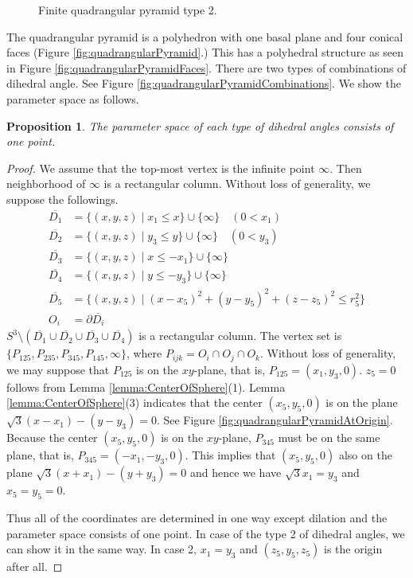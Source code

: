 \documentclass[suppldata, dvipdfmx]{interact}
\theoremstyle{plain}%
\newtheorem{proposition}[theorem]{Proposition}
\theoremstyle{definition}
\theoremstyle{remark}
\theoremstyle{problemstyle}
\begin{document}
\begin{figure}[h!tbp]
\begin{minipage}{0.5\textwidth}
\begin{minipage}[t]{0.24\textwidth}
   \label{fig:pentahedralPyramidLimitsetFinite2}
  \end{minipage}
  \hspace*{\fill}
  \caption{Finite quadrangular pyramid type 2.}
  \label{fig:pentahedralPyramidFinite2}
 \end{minipage}
\end{figure}

The quadrangular pyramid is a polyhedron with one basal plane and four conical faces (Figure \ref{fig:quadrangularPyramid}.)  
This has a polyhedral structure as seen in Figure \ref{fig:quadrangularPyramidFaces}. 
There are two types of combinations of dihedral angle. See Figure \ref{fig:quadrangularPyramidCombinations}.  
We show the parameter space as follows.

\begin{proposition}
The parameter space of each type of dihedral angles consists of one point.
\end{proposition}

\begin{proof}
We assume that the top-most vertex is the infinite point $\infty$.  Then neighborhood of $\infty$ is a rectangular column.  Without loss of generality, 
we suppose the followings.
\begin{align*}
\overline{D_1}&=\{(x,y,z) \mid x_1 \le x \} \cup\{\infty\} \quad (0<x_1)\\
\overline{D_2}&=\{(x,y,z) \mid y_3 \le y \} \cup\{\infty\}\quad (0<y_3)\\
\overline{D_3}&=\{(x,y,z) \mid x \le -x_1 \} \cup\{\infty\}\\
\overline{D_4}&=\{(x,y,z) \mid y \le -y_3 \} \cup\{\infty\}\\
\overline{D_5}&=\{(x,y,z) \mid (x-x_5)^2+(y-y_5)^2+(z-z_5)^2 \le r_5^2\} \\
O_i &= \partial\overline{D_i}
\end{align*}
$S^3\setminus(\overline{D_1}\cup\overline{D_2}\cup\overline{D_3}\cup\overline{D_4})$ is a rectangular column. The vertex set is $\{ P_{125}, P_{235}, P_{345}, P_{145}, \infty\}$, where $P_{ijk}= O_i\cap O_j\cap O_k$.  Without loss of generality, we may suppose that $P_{125}$ is on the $xy$-plane, that is, $P_{125}=(x_1, y_3, 0)$.  $z_5=0$ follows from Lemma \ref{lemma:CenterOfSphere}(1).  Lemma \ref{lemma:CenterOfSphere}(3) indicates that the center $(x_5, y_5, 0)$ is on the plane $\sqrt{3}(x-x_1)-(y-y_3)=0$.  See Figure \ref{fig:quadrangularPyramidAtOrigin}.  Because the center $(x_5, y_5,0)$ is on the $xy$-plane, $P_{345}$ must be on the same plane, that is, $P_{345}=(-x_1, -y_3, 0)$.  This implies that $(x_5, y_5, 0)$ also on the plane $\sqrt{3}(x+x_1)-(y+y_3)=0$ and hence we have $\sqrt{3}x_1 = y_3$ and $x_5=y_5=0$.

Thus all of the coordinates are determined in one way except dilation and the parameter space consists of one point.  In case of the type 2 of dihedral angles, we can show it in the same way.  In case 2, $x_1 = y_3$ and $(z_5, y_5, z_5)$ is the origin after all.
\end{proof}
\end{document}
